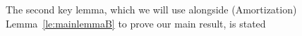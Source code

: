 The second key lemma, which we will use alongside (Amortization) 
Lemma~\ref{le:mainlemmaB} to prove our main result, is stated
\iftoggle{abstract}{next; its proof is discussed in Section~\ref{sec:gentle}.}{next and proven in Section~\ref{sec:gentle}.}
